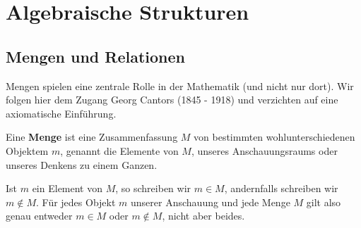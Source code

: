\chapter{Algebraische Strukturen}

\section{Mengen und Relationen}\label{section_mengen}

\setcounter{definition}{0}
\setcounter{beispiel}{0}
\setcounter{notiz}{0}

Mengen spielen eine zentrale Rolle in der Mathematik (und nicht nur dort). Wir folgen hier dem Zugang Georg 
Cantors (1845 - 1918) und verzichten auf eine axiomatische Einführung.

\begin{definition} Eine \textbf{Menge} ist eine Zusammenfassung $M$ von bestimmten wohlunterschiedenen 
Objektem $m$, genannt die Elemente von $M$, unseres Anschauungsraums oder unseres Denkens zu einem Ganzen.
\end{definition}

Ist $m$ ein Element von $M$, so schreiben wir $m \in M$, andernfalls schreiben wir $m \notin M$. 
Für jedes Objekt $m$ unserer Anschauung und jede Menge $M$ gilt also genau entweder $m \in M$  oder 
$m \notin M$, nicht aber beides. 

